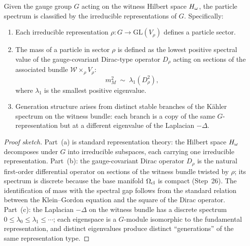 \begin{theorem}
\label{thm:particle-modules}
Given the gauge group $G$ acting on the witness Hilbert space $H_\omega$, the
particle spectrum is classified by the irreducible representations of $G$.
Specifically:
\begin{enumerate}[nosep, label=\textnormal{(\alph*)}]
  \item Each irreducible representation $\rho \colon G \to \mathrm{GL}(V_\rho)$
        defines a particle sector.
  \item The mass of a particle in sector $\rho$ is defined as the lowest
        positive spectral value of the gauge-covariant Dirac-type operator
        $D_\rho$ acting on sections of the associated bundle
        $\mathcal{W} \times_\rho V_\rho$:
        \[
          m_M^2 \;\sim\; \lambda_1(D_\rho^2),
        \]
        where $\lambda_1$ is the smallest positive eigenvalue.
  \item Generation structure arises from distinct stable branches of the
        K\"{a}hler spectrum on the witness bundle: each branch is a copy of
        the same $G$-representation but at a different eigenvalue of the
        Laplacian $-\Delta$.
\end{enumerate}
\begin{proof}[Proof sketch]
Part~(a) is standard representation theory: the Hilbert space $H_\omega$
decomposes under $G$ into irreducible subspaces, each carrying one
irreducible representation.  Part~(b): the gauge-covariant Dirac operator
$D_\rho$ is the natural first-order differential operator on sections of
the witness bundle twisted by $\rho$; its spectrum is discrete because the
base manifold $\Omega_{\mathrm{cl}}$ is compact (Step~26).  The identification of mass
with the spectral gap follows from the standard relation between the
Klein--Gordon equation and the square of the Dirac operator.  Part~(c):
the Laplacian $-\Delta$ on the witness bundle has a discrete spectrum
$0 \leq \lambda_0 \leq \lambda_1 \leq \cdots$; each eigenspace is a
$G$-module isomorphic to the fundamental representation, and distinct
eigenvalues produce distinct ``generations'' of the same representation
type.

\end{proof}
\end{theorem}

